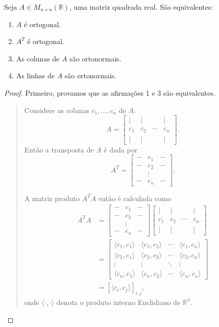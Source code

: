 \begin{theorem}
	Seja $A\in M_{n\times n}(\mathbb{R})$, uma matriz quadrada real. São equivalentes:
	\begin{enumerate}
		\item $A$ é ortogonal.
		\item $A^T$ é ortogonal.
		\item As colunas de $A$ são ortonormais.
		\item As linhas de $A$ são ortonormais.
	\end{enumerate}
\end{theorem}

\begin{proof}
	Primeiro, provamos que as afirmações 1 e 3 são equivalentes.
	
		\begin{quote}
			Considere as colunas $c_1,\ldots,c_n$ de $A$:
			\[A=\begin{bmatrix}
				| & | & & |\\
				c_1 & c_2 & \cdots & c_n\\
				| & | & & |\end{bmatrix}.\]
			Então a transposta de $A$ é dada por
			\[A^T=\begin{bmatrix}
			- & c_1 & -\\
			- & c_2 & -\\
			  & \vdots & \\
			- & c_n & -\end{bmatrix}.\]
			
			A matriz produto $A^TA$ então é calculada como
			\begin{align*}
				A^T A
					&=\begin{bmatrix}
						- & c_1 & -\\
						- & c_2 & -\\
						  & \vdots & \\
						- & c_n & -\end{bmatrix}
					\begin{bmatrix}
						| & | & & |\\
						c_1 & c_2 & \cdots & c_n\\
						| & | & & |
					\end{bmatrix}\\
					&=\begin{bmatrix}
						\langle c_1,c_1\rangle & \langle c_1,c_2\rangle & \cdots & \langle c_1,c_n\rangle\\
						\langle c_2,c_1\rangle & \langle c_2,c_2\rangle & \cdots & \langle c_2,c_n\rangle\\
						\vdots & \vdots & \ddots & \vdots\\
						\langle c_n,c_1\rangle & \langle c_n,c_2\rangle & \cdots & \langle c_n,c_n\rangle
					\end{bmatrix}\\
					&=[\langle c_i,c_j\rangle]_{i,j},
			\end{align*}
			onde $\langle\cdot,\cdot\rangle$ denota o produto interno Euclidiano de $\mathbb{R}^n$.
			

\end{quote}
\end{proof}
